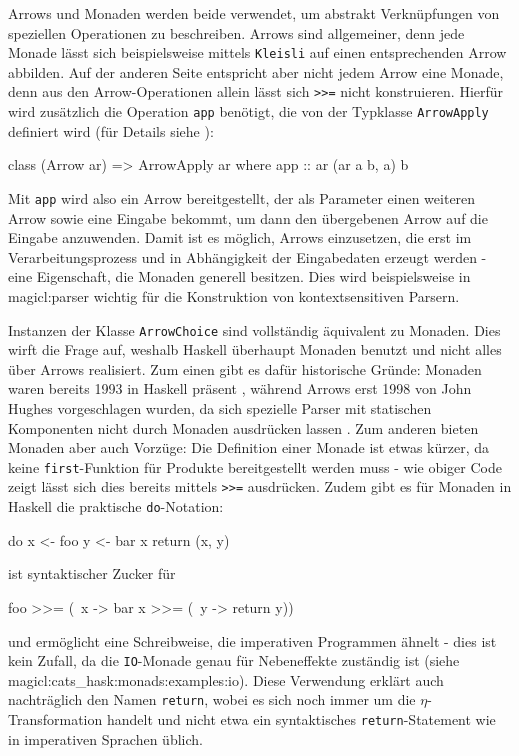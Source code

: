 \documentclass[a4paper, bibgerm]{book}
\newcommand\icode[1]{\lstinline?#1?}
\newcommand\sref{}
\begin{document}
Arrows und Monaden werden beide verwendet, um abstrakt Verknüpfungen von
speziellen Operationen zu beschreiben. Arrows sind allgemeiner, denn
jede Monade lässt sich beispielsweise mittels \icode{Kleisli} auf einen
entsprechenden Arrow abbilden. Auf der anderen Seite entspricht aber
nicht jedem Arrow eine Monade, denn aus den Arrow-Operationen allein
lässt sich \icode{>>=} %
nicht konstruieren. Hierfür wird zusätzlich die Operation \icode{app}
benötigt, die von der Typklasse \icode{ArrowApply} definiert wird (für
Details siehe \cite[S. 18f]{Hughes}):
\begin{code}
class (Arrow ar) => ArrowApply ar where
  app :: ar (ar a b, a) b
\end{code}
Mit \icode{app} wird also ein Arrow bereitgestellt, der als Parameter
einen weiteren Arrow sowie eine Eingabe bekommt, um dann den übergebenen
Arrow auf die Eingabe anzuwenden. Damit ist es möglich, Arrows
einzusetzen, die erst im Verarbeitungsprozess und in Abhängigkeit der
Eingabedaten erzeugt werden - eine Eigenschaft, die Monaden generell
besitzen. Dies wird beispielsweise in \sref{magicl:parser} wichtig für
die Konstruktion von kontextsensitiven Parsern.

Instanzen der Klasse \icode{ArrowChoice} sind vollständig äquivalent zu
Monaden.  Dies wirft die Frage auf, weshalb Haskell überhaupt Monaden
benutzt und nicht alles über Arrows realisiert. Zum einen gibt es dafür
historische Gründe: Monaden waren bereits 1993 in Haskell präsent
\cite[S.23ff]{HaskellHistory}, während Arrows erst 1998 von John Hughes
vorgeschlagen wurden, da sich spezielle Parser mit statischen
Komponenten nicht durch Monaden ausdrücken lassen \cite{Hughes}. Zum
anderen bieten Monaden aber auch Vorzüge: Die Definition einer Monade
ist etwas kürzer, da keine \icode{first}-Funktion für Produkte
bereitgestellt werden muss - wie obiger Code zeigt lässt sich dies
bereits mittels \icode{>>=} %
ausdrücken. Zudem gibt es für Monaden in Haskell die praktische
\icode{do}-Notation:
\begin{code}
do x <- foo
   y <- bar x
   return (x, y)
\end{code}
ist syntaktischer Zucker für
\begin{code}
foo >>= (\ x ->
  bar x >>= (\ y ->
    return y))
\end{code} %
und ermöglicht eine Schreibweise, die imperativen Programmen ähnelt -
dies ist kein Zufall, da die \icode{IO}-Monade genau für Nebeneffekte
zuständig ist (siehe \sref{magicl:cats_hask:monads:examples:io}). Diese
Verwendung erklärt auch nachträglich den Namen \icode{return}, wobei es
sich noch immer um die $\eta$-Transformation handelt und nicht etwa ein
syntaktisches \icode{return}-Statement wie in imperativen Sprachen
üblich.
\end{document}
